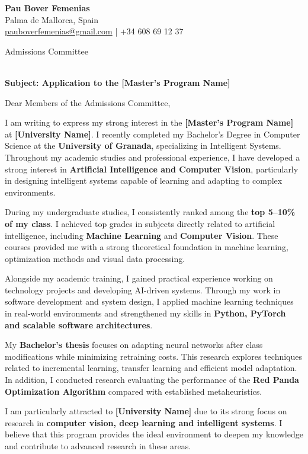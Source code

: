 \documentclass[11pt,a4paper]{letter}
\makeatletter
\newcommand{\ApplicantName}{Pau Bover Femenias}
\newcommand{\ApplicantCity}{Palma de Mallorca, Spain}
\newcommand{\ApplicantEmail}{pauboverfemenias@gmail.com}
\newcommand{\ApplicantPhone}{+34 608 69 12 37}
\newcommand{\University}{[University Name]}
\newcommand{\Program}{[Master’s Program Name]}
\newcommand{\Degree}{Bachelor’s Degree in Computer Science}
\newcommand{\UniversityOrigin}{University of Granada}
\newcommand{\Specialization}{Intelligent Systems}
\newcommand{\ResearchAreas}{Artificial Intelligence and Computer Vision}
\newcommand{\TopPerformance}{top 5–10\% of my class}
\newcommand{\ApplicantHeader}{
{\Large\textbf{\ApplicantName}}\\
\ApplicantCity \\
\href{mailto:\ApplicantEmail}{\ApplicantEmail} \quad | \quad \ApplicantPhone
}
\newcommand{\UniversityHeader}{
Admissions Committee\\
\University\\
\Program
}
\makeatother
\begin{document}
\ApplicantHeader

\vspace{20pt}

\UniversityHeader

\vspace{20pt}

\textbf{Subject: Application to the \Program}

\vspace{10pt}

Dear Members of the Admissions Committee,

I am writing to express my strong interest in the \textbf{\Program} at \textbf{\University}. I recently completed my \Degree{} at the \textbf{\UniversityOrigin}, specializing in \Specialization. Throughout my academic studies and professional experience, I have developed a strong interest in \textbf{\ResearchAreas}, particularly in designing intelligent systems capable of learning and adapting to complex environments.

During my undergraduate studies, I consistently ranked among the \textbf{\TopPerformance}. I achieved top grades in subjects directly related to artificial intelligence, including \textbf{Machine Learning} and \textbf{Computer Vision}. These courses provided me with a strong theoretical foundation in machine learning, optimization methods and visual data processing.

Alongside my academic training, I gained practical experience working on technology projects and developing AI-driven systems. Through my work in software development and system design, I applied machine learning techniques in real-world environments and strengthened my skills in \textbf{Python, PyTorch and scalable software architectures}.

My \textbf{Bachelor’s thesis} focuses on adapting neural networks after class modifications while minimizing retraining costs. This research explores techniques related to incremental learning, transfer learning and efficient model adaptation. In addition, I conducted research evaluating the performance of the \textbf{Red Panda Optimization Algorithm} compared with established metaheuristics.

I am particularly attracted to \textbf{\University} due to its strong focus on research in \textbf{computer vision, deep learning and intelligent systems}. I believe that this program provides the ideal environment to deepen my knowledge and contribute to advanced research in these areas.
\end{document}
